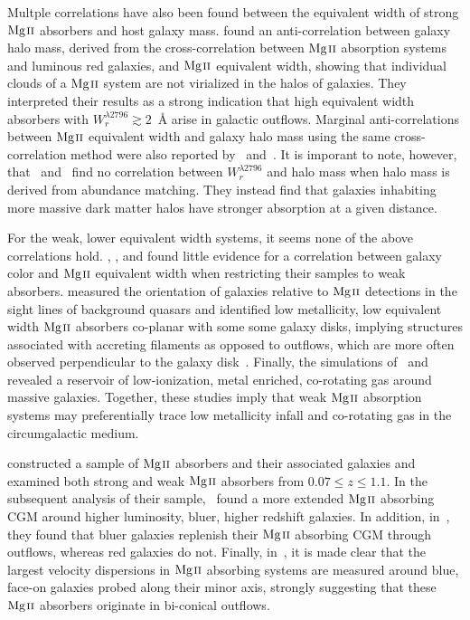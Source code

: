Multple correlations have also been found between the equivalent width of strong ${\hbox{{\rm Mg}\kern 0.1em{\sc ii}}}$ absorbers and host galaxy mass. \cite{Bouche2006} found an anti-correlation between galaxy halo mass, derived from the cross-correlation between ${\hbox{{\rm Mg}\kern 0.1em{\sc ii}}}$ absorption systems and luminous red galaxies, and ${\hbox{{\rm Mg}\kern 0.1em{\sc ii}}}$ equivalent width, showing that individual clouds of a ${\hbox{{\rm Mg}\kern 0.1em{\sc ii}}}$ system are not virialized in the halos of galaxies. They interpreted their results as a strong indication that high equivalent width absorbers with $W_r^{\lambda2796} \gtrsim 2$~{\AA} arise in galactic outflows. Marginal anti-correlations between ${\hbox{{\rm Mg}\kern 0.1em{\sc ii}}}$ equivalent width and galaxy halo mass using the same cross-correlation method were also reported by~\cite{Gauthier2009} and~\cite{Lundgren2009}. It is imporant to note, however, that~\cite{Churchill2013letter} and~\cite{MAGIICAT3} find no correlation between $W_r^{\lambda2796}$ and halo mass when halo mass is derived from abundance matching. They instead find that galaxies inhabiting more massive dark matter halos have stronger absorption at a given distance.

For the weak, lower equivalent width systems, it seems none of the above correlations hold. \cite{Chen2010b}, \cite{Kacprzak2011}, and \cite{Lovegrove2011} found little evidence for a correlation between galaxy color and ${\hbox{{\rm Mg}\kern 0.1em{\sc ii}}}$ equivalent width when restricting their samples to weak absorbers. \cite{Kacprzak2011} measured the orientation of galaxies relative to ${\hbox{{\rm Mg}\kern 0.1em{\sc ii}}}$ detections in the sight lines of background quasars and identified low metallicity, low equivalent width ${\hbox{{\rm Mg}\kern 0.1em{\sc ii}}}$ absorbers co-planar with some some galaxy disks, implying structures associated with accreting filaments as opposed to outflows, which are more often observed perpendicular to the galaxy disk~\citep{Bordoloi2011,Kacprzak2012-PA,Bouche2012}. Finally, the simulations of~\cite{Stewart2011} and~\cite{Ford2013mass} revealed a reservoir of low-ionization, metal enriched, co-rotating gas around massive galaxies. Together, these studies imply that weak ${\hbox{{\rm Mg}\kern 0.1em{\sc ii}}}$ absorption systems may preferentially trace low metallicity infall and co-rotating gas in the circumgalactic medium.

\cite{MAGIICAT1} constructed a sample of ${\hbox{{\rm Mg}\kern 0.1em{\sc ii}}}$ absorbers and their associated galaxies and examined both strong and weak ${\hbox{{\rm Mg}\kern 0.1em{\sc ii}}}$ absorbers from $0.07 \le z \le 1.1$. In the subsequent analysis of their sample,~\cite{MAGIICAT2} found a more extended ${\hbox{{\rm Mg}\kern 0.1em{\sc ii}}}$ absorbing CGM around higher luminosity, bluer, higher redshift galaxies. In addition, in~\cite{MAGIICAT4}, they found that bluer galaxies replenish their ${\hbox{{\rm Mg}\kern 0.1em{\sc ii}}}$ absorbing CGM through outflows, whereas red galaxies do not. Finally, in~\cite{MAGIICAT5}, it is made clear that the largest velocity dispersions in ${\hbox{{\rm Mg}\kern 0.1em{\sc ii}}}$ absorbing systems are measured around blue, face-on galaxies probed along their minor axis, strongly suggesting that these ${\hbox{{\rm Mg}\kern 0.1em{\sc ii}}}$ absorbers originate in bi-conical outflows.

